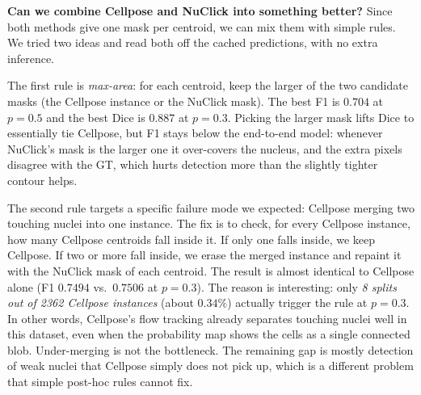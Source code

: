 \documentclass[10pt,conference]{IEEEtran}
\begin{document}
\textbf{Can we combine Cellpose and NuClick into something better?}
Since both methods give one mask per centroid, we can mix them with simple rules. We tried
two ideas and read both off the cached predictions, with no extra inference.

The first rule is \emph{max-area}: for each centroid, keep the larger of the two candidate
masks (the Cellpose instance or the NuClick mask). The best F1 is $0.704$ at $p{=}0.5$ and the
best Dice is $0.887$ at $p{=}0.3$. Picking the larger mask lifts Dice to essentially tie Cellpose,
but F1 stays below the end-to-end model: whenever NuClick's mask is the larger one it over-covers
the nucleus, and the extra pixels disagree with the GT, which hurts detection more than the slightly
tighter contour helps.

The second rule targets a specific failure mode we expected: Cellpose merging two touching nuclei
into one instance. The fix is to check, for every Cellpose instance, how many Cellpose centroids
fall inside it. If only one falls inside, we keep Cellpose. If two or more fall inside, we erase
the merged instance and repaint it with the NuClick mask of each centroid. The result is almost
identical to Cellpose alone (F1 $0.7494$ vs.\ $0.7506$ at $p{=}0.3$). The reason is interesting:
only \emph{8 splits out of 2362 Cellpose instances} (about $0.34\%$) actually trigger the rule at
$p{=}0.3$. In other words, Cellpose's flow tracking already separates touching nuclei well in this
dataset, even when the probability map shows the cells as a single connected blob. Under-merging is
not the bottleneck. The remaining gap is mostly detection of weak nuclei that Cellpose simply
does not pick up, which is a different problem that simple post-hoc rules cannot fix.

\end{document}
